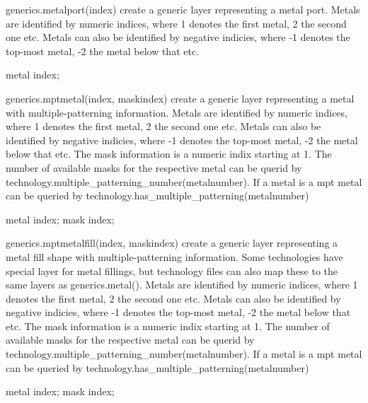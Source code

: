 \begin{APIfunc}{generics.metalport(index)}
    create a generic layer representing a metal port. Metals are identified by numeric indices, where 1 denotes the first metal, 2 the second one etc. Metals can also be identified by negative indicies, where -1 denotes the top-most metal, -2 the metal below that etc.
    \begin{APIparameters}
            metal index;
    \end{APIparameters}
\end{APIfunc}
\begin{APIfunc}{generics.mptmetal(index, maskindex)}
    create a generic layer representing a metal with multiple-patterning information. Metals are identified by numeric indices, where 1 denotes the first metal, 2 the second one etc. Metals can also be identified by negative indicies, where -1 denotes the top-most metal, -2 the metal below that etc. The mask information is a numeric indix starting at 1. The number of available masks for the respective metal can be querid by technology.multiple\_patterning\_number(metalnumber). If a metal is a mpt metal can be queried by technology.has\_multiple\_patterning(metalnumber)
    \begin{APIparameters}
            metal index;
            mask index;
    \end{APIparameters}
\end{APIfunc}
\begin{APIfunc}{generics.mptmetalfill(index, maskindex)}
    create a generic layer representing a metal fill shape with multiple-patterning information. Some technologies have special layer for metal fillings, but technology files can also map these to the same layers as generics.metal(). Metals are identified by numeric indices, where 1 denotes the first metal, 2 the second one etc. Metals can also be identified by negative indicies, where -1 denotes the top-most metal, -2 the metal below that etc. The mask information is a numeric indix starting at 1. The number of available masks for the respective metal can be querid by technology.multiple\_patterning\_number(metalnumber). If a metal is a mpt metal can be queried by technology.has\_multiple\_patterning(metalnumber)
    \begin{APIparameters}
            metal index;
            mask index;
    \end{APIparameters}
\end{APIfunc}
